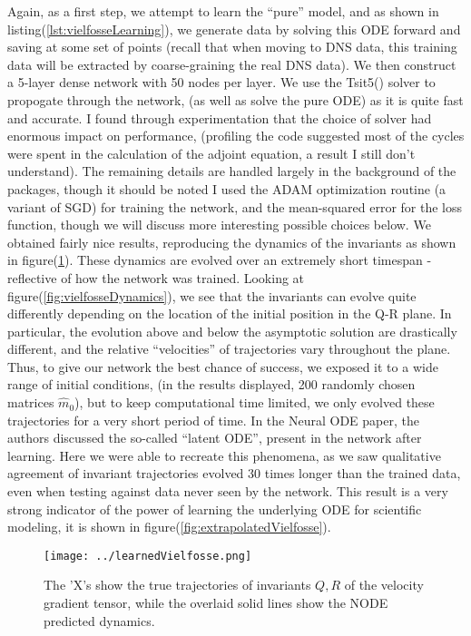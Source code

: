 \documentclass{amsart}
\begin{document}
\indent Again, as a first step, we attempt to learn the ``pure'' model, and as shown in listing(\ref{lst:vielfosseLearning}), we generate data by solving this ODE forward and saving at some set of points (recall that when moving to DNS data, this training data will be extracted by coarse-graining the real DNS data). We then construct a 5-layer dense network with 50 nodes per layer. We use the Tsit5() solver to propogate through the network, (as well as solve the pure ODE) as it is quite fast and accurate. I found through experimentation that the choice of solver had enormous impact on performance, (profiling the code suggested most of the cycles were spent in the calculation of the adjoint equation, a result I still don't understand). The remaining details are handled largely in the background of the packages, though it should be noted I used the ADAM optimization routine (a variant of SGD) for training the network, and the mean-squared error for the loss function, though we will discuss more interesting possible choices below.\newline
\indent We obtained fairly nice results, reproducing the dynamics of the invariants as shown in figure(\ref{fig:learnedVielfosse}). These dynamics are evolved over an extremely short timespan - reflective of how the network was trained. Looking at figure(\ref{fig:vielfosseDynamics}), we see that the invariants can evolve quite differently depending on the location of the initial position in the Q-R plane. In particular, the evolution above and below the asymptotic solution are drastically different, and the relative ``velocities'' of trajectories vary throughout the plane. Thus, to give our network the best chance of success, we exposed it to a wide range of initial conditions, (in the results displayed, 200 randomly chosen matrices $\hat m_0$), but to keep computational time limited, we only evolved these trajectories for a very short period of time.\newline
\indent In the Neural ODE paper, the authors discussed the so-called ``latent ODE'', present in the network after learning. Here we were able to recreate this phenomena, as we saw qualitative agreement of invariant trajectories evolved 30 times longer than the trained data, even when testing against data never seen by the network. This result is a very strong indicator of the power of learning the underlying ODE for scientific modeling, it is shown in figure(\ref{fig:extrapolatedVielfosse}).

\begin{figure}%
  \centering
  \texttt{[image: ../learnedVielfosse.png]}
  \caption{The 'X's show the true trajectories of invariants $Q,R$ of the velocity gradient tensor, while the overlaid solid lines show the NODE predicted dynamics.}
  \label{fig:learnedVielfosse}
\end{figure}
\end{document}
